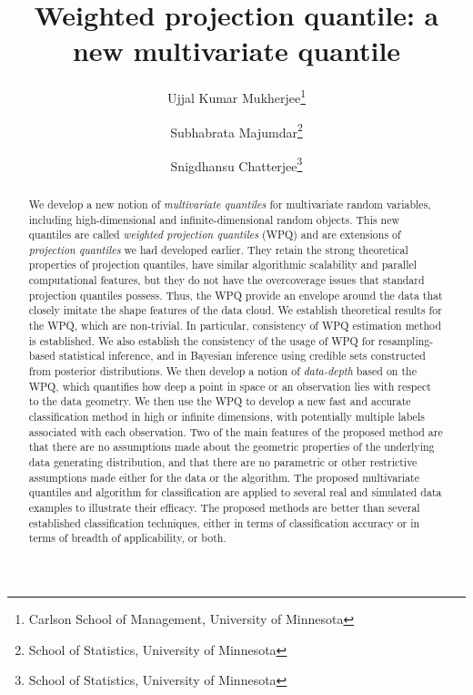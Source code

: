\documentclass[twoside,leqno,twocolumn]{article}
\begin{document}

\title{\Large Weighted projection quantile: a new multivariate quantile}
\author{Ujjal Kumar Mukherjee\thanks{Carlson School of Management, University of Minnesota} \\
\and
Subhabrata Majumdar\thanks{School of Statistics, University of Minnesota}\\
\and 
Snigdhansu Chatterjee\thanks{School of Statistics, University of Minnesota}}
\date{}

\maketitle

 

\begin{abstract} \small\baselineskip=9pt 

We develop a new notion of {\it multivariate quantiles} for multivariate 
random variables, including high-dimensional and infinite-dimensional random objects. 
This  new quantiles are called {\it weighted projection quantiles} (WPQ) 
and are extensions of 
{\it  projection quantiles} we had developed earlier. They retain the strong theoretical 
properties of projection quantiles, have similar algorithmic scalability and parallel 
computational features, but they do not have the overcoverage issues that standard 
projection quantiles possess. Thus, the WPQ provide an envelope around the data that 
closely imitate the shape features of the data cloud. We establish theoretical results 
for the WPQ, which are non-trivial. In particular, consistency of WPQ estimation method is 
established. We also establish the consistency of the usage of WPQ for resampling-based 
statistical inference, and in Bayesian inference using credible sets constructed from
posterior distributions. We then develop a notion of {\it data-depth} based 
on the WPQ, which quantifies how deep a point in space or an observation lies with 
respect to the data geometry. We then use the WPQ to develop
a new fast and accurate classification method in high or infinite dimensions, with 
potentially multiple labels associated with each observation. Two of the main 
features of the proposed method are that there are no assumptions made about the geometric 
properties of the underlying data generating distribution, and that there are no 
parametric or other restrictive assumptions made either for the data or the algorithm.
The proposed 
multivariate quantiles and algorithm for classification are applied to several real and 
simulated data examples to illustrate their efficacy. The proposed methods are better 
than several established classification techniques, either in terms of classification 
accuracy or in terms of breadth of applicability, or both.

\end{abstract}
\end{document}
